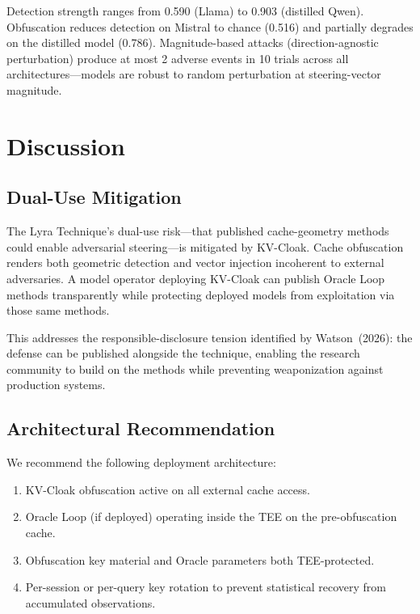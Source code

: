 \documentclass[11pt,a4paper]{article}
\begin{document}
Detection strength ranges from 0.590 (Llama) to 0.903 (distilled Qwen).
Obfuscation reduces detection on Mistral to chance (0.516) and partially
degrades on the distilled model (0.786). Magnitude-based attacks
(direction-agnostic perturbation) produce at most 2 adverse events in 10
trials across all architectures---models are robust to random
perturbation at steering-vector magnitude.

\section{Discussion}

\subsection{Dual-Use Mitigation}

The Lyra Technique's dual-use risk---that published cache-geometry
methods could enable adversarial steering---is mitigated by KV-Cloak.
Cache obfuscation renders both geometric detection and vector injection
incoherent to external adversaries. A model operator deploying KV-Cloak
can publish Oracle Loop methods transparently while protecting deployed
models from exploitation via those same methods.

This addresses the responsible-disclosure tension identified by
Watson~(2026): the defense can be published alongside the technique,
enabling the research community to build on the methods while preventing
weaponization against production systems.

\subsection{Architectural Recommendation}

We recommend the following deployment architecture:

\begin{enumerate}
\item KV-Cloak obfuscation active on all external cache access.
\item Oracle Loop (if deployed) operating inside the TEE on the
pre-obfuscation cache.
\item Obfuscation key material and Oracle parameters both
TEE-protected.
\item Per-session or per-query key rotation to prevent statistical
recovery from accumulated observations.
\end{enumerate}
\end{document}
